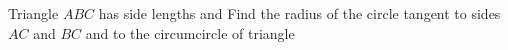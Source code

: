 Triangle $ABC$ has side lengths   and   Find the radius of the circle tangent to sides $AC$ and $BC$ and to the circumcircle of triangle 